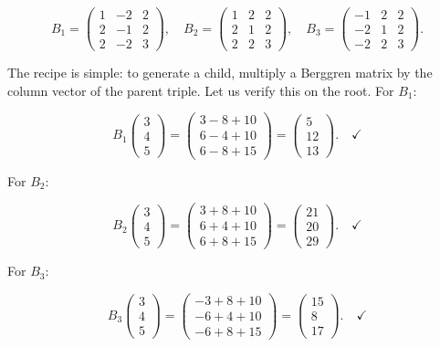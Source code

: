 \[B_1 = \begin{pmatrix} 1 & -2 & 2 \\ 2 & -1 & 2 \\ 2 & -2 & 3 \end{pmatrix}, \quad B_2 = \begin{pmatrix} 1 & 2 & 2 \\ 2 & 1 & 2 \\ 2 & 2 & 3 \end{pmatrix}, \quad B_3 = \begin{pmatrix} -1 & 2 & 2 \\ -2 & 1 & 2 \\ -2 & 2 & 3 \end{pmatrix}.\]

The recipe is simple: to generate a child, multiply a Berggren matrix by the column vector of the parent triple. Let us verify this on the root. For \(B_1\):

\[B_1 \begin{pmatrix} 3 \\ 4 \\ 5 \end{pmatrix} = \begin{pmatrix} 3 - 8 + 10 \\ 6 - 4 + 10 \\ 6 - 8 + 15 \end{pmatrix} = \begin{pmatrix} 5 \\ 12 \\ 13 \end{pmatrix}. \quad \checkmark\]

For \(B_2\):

\[B_2 \begin{pmatrix} 3 \\ 4 \\ 5 \end{pmatrix} = \begin{pmatrix} 3 + 8 + 10 \\ 6 + 4 + 10 \\ 6 + 8 + 15 \end{pmatrix} = \begin{pmatrix} 21 \\ 20 \\ 29 \end{pmatrix}. \quad \checkmark\]

For \(B_3\):

\[B_3 \begin{pmatrix} 3 \\ 4 \\ 5 \end{pmatrix} = \begin{pmatrix} -3 + 8 + 10 \\ -6 + 4 + 10 \\ -6 + 8 + 15 \end{pmatrix} = \begin{pmatrix} 15 \\ 8 \\ 17 \end{pmatrix}. \quad \checkmark\]

